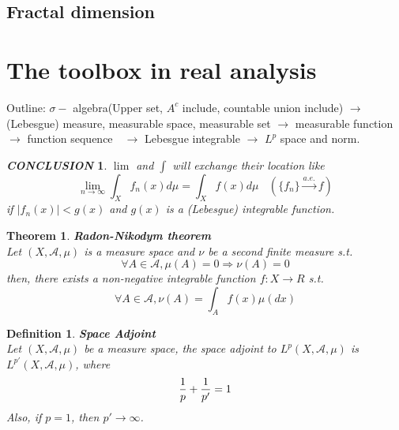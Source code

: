 \documentclass[12pt]{article}
\theoremstyle{plain}
\newtheorem{theorem}{\textbf{Theorem}}[section]
\newtheorem{definition}{\textbf{Definition}}[section]
\newtheorem{conclusion}{\textit{\textbf{CONCLUSION}}}[section]
\begin{document}
\subsection{Fractal dimension}







\newpage
\appendix
\section{The toolbox in real analysis}

Outline: $\sigma -$ algebra(Upper set, $A^c$ include, countable union include) $\rightarrow$ (Lebesgue) measure, measurable space, measurable set $\rightarrow$ measurable function $\rightarrow$ function sequence　$\rightarrow $ Lebesgue integrable $\rightarrow$ $L^p$ space and norm.


\begin{conclusion} $\lim$ and $\int$ will exchange their location like 
$$
\lim_{n\rightarrow \infty}\int_{X}f_n(x) d\mu = \int_{X}f(x)d\mu\ \ \ \ (\{f_n\} \xrightarrow {a.e.} f)
$$
if $|f_n(x)| < g(x)$ and $g(x)$ is a (Lebesgue) integrable function.
\end{conclusion}

\begin{theorem}\textbf{Radon-Nikodym theorem} 
\\\noindent Let $(X, \mathcal A, \mu)$ is a measure space and $\nu$ be a second finite measure s.t. 
$$
\forall A \in \mathcal A, \mu(A) = 0 \Rightarrow \nu(A) = 0
$$
then, there exists a non-negative integrable function $f:X \rightarrow R$ s.t.
$$
\forall A \in \mathcal A, \nu(A) = \int_{A}f(x) \mu(dx)
$$
\end{theorem}



\begin{definition}\textbf{Space Adjoint}
\\\noindent Let $(X, \mathcal A, \mu)$ be a measure space, the space adjoint to $L^p(X, \mathcal A, \mu)$ is $L^{p'}(X, \mathcal A, \mu)$, where 
$$
{1\over p } + {1\over p' }  = 1
$$
         Also, if $p = 1$, then $p' \rightarrow \infty$.
\end{definition}
\end{document}
